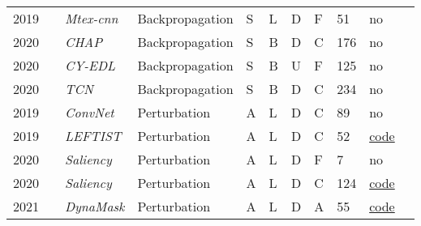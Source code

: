 \begin{table*}[p]
\begin{tabular}{@{}lllllllllll@{}}
    2019        & \cite{assaf_mtex-cnn_2019}                  &\textit{Mtex-cnn}  & Backpropagation&S       & L         & D      & F                        & 51                & no\\ 


    2020        & \cite{cho_interpretation_2020}   &\textit{CHAP}      & Backpropagation     & S      & B          & D      & C                           & 176               & no\\

    2020        &   \cite{wolanin_estimating_2020}       & \textit{CY-EDL}   & Backpropagation     &S       & B          & U   & F                          & 125               & no \\

    2020        & \cite{lauritsen_early_2020}   &\textit{TCN}       &Backpropagation      &S       & B          & D      & C                    & 234               &no\\ 
    
    2019        & \cite{kashiparekh_convtimenet_2019}&\textit{ConvNet}& Perturbation  &A       & L         & D      & C                    & 89                & no \\ 
    2019        & \cite{guilleme_agnostic_2019} &\textit{LEFTIST} & Perturbation    & A        & L         & D      & C                     & 52                & \href{https://www.dropbox.com/s/y1xq5bhpf0irg2h/code_LEFTIST.zip?e=2}{code} \\
    
    2020        & \cite{pan_series_2020}           &\textit{Saliency}& Perturbation    &A       & L         & D      & F                       & 7                 & no \\ 

    2020        & \cite{ismail_benchmarking_2020}           &\textit{Saliency}& Perturbation    &A       & L         & D      & C                    & 124               & \href{https://github.com/ayaabdelsalam91/TS-Interpretability-Benchmark}{code}\\ 

    2021        &\cite{crabbe_explaining_2021}    & \textit{DynaMask}     & Perturbation  & A      & L     & D      & A                    & 55            & \href{https://github.com/JonathanCrabbe/Dynamask}{code}   \\ 


\end{tabular}
\end{table*}
